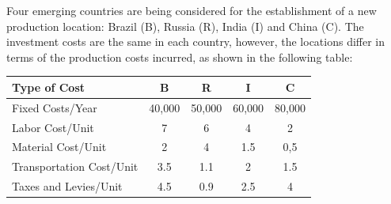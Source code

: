 Four emerging countries are being considered for the establishment of a new production location: Brazil (B), Russia (R), India (I) and China (C). The investment costs are the same in each country, however, the locations differ in terms of the production costs incurred, as shown in the following table:
\begin{table}[htbp]
  \centering
    \begin{tabular}{l|cccc}
    Type of Cost & B & R & I & C \\
    \hline
Fixed Costs/Year & 40,000 & 50,000 &  60,000 & 80,000  \\
Labor Cost/Unit & 7 & 6 & 4 & 2 \\
Material Cost/Unit & 2 & 4 & 1.5 & 0,5 \\
Transportation Cost/Unit & 3.5	& 1.1 & 2	& 1.5 \\
Taxes and Levies/Unit & 4.5 & 0.9 & 2.5 & 4 \\
\end{tabular}
\end{table}

